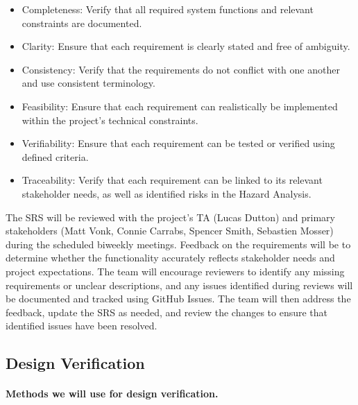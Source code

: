 \documentclass[12pt, titlepage]{article}
\begin{document}
\begin{itemize}
  \item Completeness: Verify that all required system functions and relevant constraints are documented.
  \item Clarity: Ensure that each requirement is clearly stated and free of ambiguity.
  \item Consistency: Verify that the requirements do not conflict with one another and use consistent terminology.
  \item Feasibility: Ensure that each requirement can realistically be implemented within the project's technical constraints.
  \item Verifiability: Ensure that each requirement can be tested or verified using defined criteria.
  \item Traceability: Verify that each requirement can be linked to its relevant stakeholder needs, as well as identified risks in the Hazard Analysis.
\end{itemize}

\noindent The SRS will be reviewed with the project's TA (Lucas Dutton) and primary stakeholders (Matt 
Vonk, Connie Carrabs, Spencer Smith, Sebastien Mosser) during the scheduled biweekly meetings. 
Feedback on the requirements will be to determine whether the functionality accurately reflects 
stakeholder needs and project expectations. The team will encourage reviewers to identify any 
missing requirements or unclear descriptions, and any issues identified during reviews will be 
documented and tracked using GitHub Issues. The team will then address the feedback, update the 
SRS as needed, and review the changes to ensure that identified issues have been resolved.


\subsection{Design Verification}

\paragraph{Methods we will use for design verification.}
\end{document}
